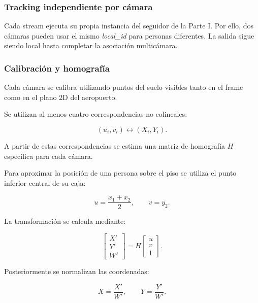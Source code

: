 \documentclass[12pt,a4paper]{article}
\begin{document}
\subsubsection{Tracking independiente por cámara}

Cada stream ejecuta su propia instancia del seguidor de la Parte I. Por
ello, dos cámaras pueden usar el mismo \textit{local\_id} para personas
diferentes. La salida sigue siendo local hasta completar la asociación
multicámara.

\subsubsection{Calibración y homografía}

Cada cámara se calibra utilizando puntos del suelo visibles tanto en el
frame como en el plano 2D del aeropuerto.

Se utilizan al menos cuatro correspondencias no colineales:

\begin{equation}
(u_i,v_i)
\leftrightarrow
(X_i,Y_i).
\end{equation}

A partir de estas correspondencias se estima una matriz de homografía
$H$ específica para cada cámara.

Para aproximar la posición de una persona sobre el piso se utiliza el
punto inferior central de su caja:

\begin{equation}
u=\frac{x_1+x_2}{2},
\qquad
v=y_2.
\end{equation}

La transformación se calcula mediante:

\begin{equation}
\begin{bmatrix}
X'\\
Y'\\
W'
\end{bmatrix}
=
H
\begin{bmatrix}
u\\
v\\
1
\end{bmatrix}.
\end{equation}

Posteriormente se normalizan las coordenadas:

\begin{equation}
X=\frac{X'}{W'},
\qquad
Y=\frac{Y'}{W'}.
\end{equation}
\end{document}

